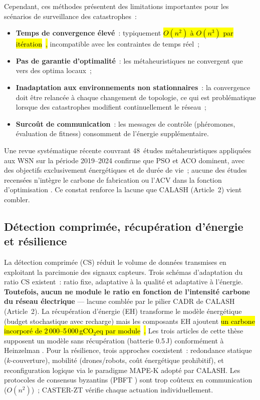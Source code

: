 Cependant, ces méthodes présentent des limitations importantes pour les scénarios de surveillance des catastrophes~:
\begin{itemize}
    \item \textbf{Temps de convergence élevé}~: typiquement \hl{$O(n^2)$ à $O(n^3)$ par itération}~\cite{dorigo2004ant,kennedy1995pso}\hl{,} incompatible avec les contraintes de temps réel~;
    \item \textbf{Pas de garantie d'optimalité}~: les métaheuristiques ne convergent que vers des optima locaux~;
    \item \textbf{Inadaptation aux environnements non stationnaires}~: la convergence doit être relancée à chaque changement de topologie, ce qui est problématique lorsque des catastrophes modifient continuellement le réseau~;
    \item \textbf{Surcoût de communication}~: les messages de contrôle (phéromones, évaluation de fitness) consomment de l'énergie supplémentaire.
\end{itemize}
Une revue systématique récente couvrant 48~études métaheuristiques appliquées aux WSN sur la période 2019--2024 confirme que PSO et ACO dominent, avec des objectifs exclusivement énergétiques et de durée de vie~; aucune des études recensées n'intègre le carbone de fabrication ou l'ACV dans la fonction d'optimisation \cite{metaheuristic_wsn_slr2026}. Ce constat renforce la lacune que CALASH (Article~2) vient combler.
\subsection{Détection comprimée, récupération d'énergie et résilience}

La détection comprimée (CS) \cite{candes2006cs} réduit le volume de données transmises en exploitant la parcimonie des signaux capteurs. Trois schémas d'adaptation du ratio CS existent~: ratio fixe, adaptative à la qualité et adaptative à l'énergie. \textbf{Toutefois, aucun ne module le ratio en fonction de l'intensité carbone du réseau électrique} --- lacune comblée par le pilier CADR de CALASH (Article~2). La récupération d'énergie (EH) transforme le modèle énergétique (budget stochastique avec recharge) mais les composants EH ajoutent \hl{un carbone incorporé de 2\,000--5\,000\,gCO$_2$eq par module}~\cite{pirson2021embodied}\hl{.} Les trois articles de cette thèse supposent un modèle sans récupération (batterie 0.5\,J) conformément à Heinzelman \cite{heinzelman2000leach}. Pour la résilience, trois approches coexistent~: redondance statique ($k$-couverture), mobilité (drones/robots, coût énergétique prohibitif), et reconfiguration logique via le paradigme MAPE-K adopté par CALASH. Les protocoles de consensus byzantins (PBFT \cite{castro1999pbft}) sont trop coûteux en communication ($O(n^2)$)~; CASTER-ZT vérifie chaque actuation individuellement.

